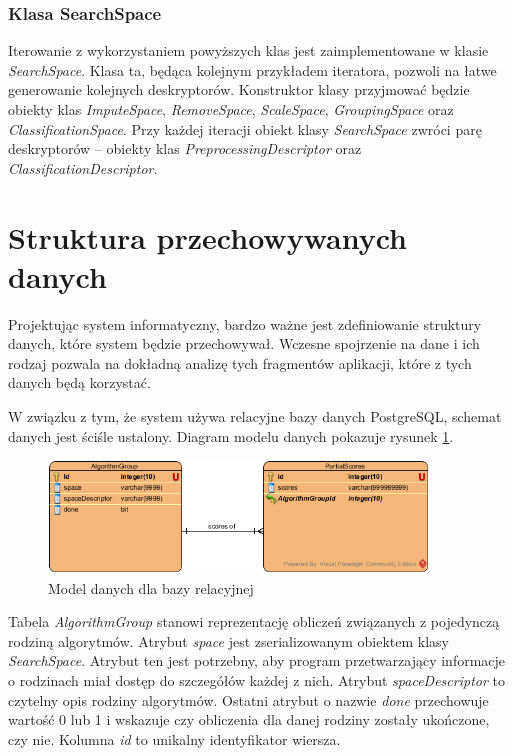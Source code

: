 \documentclass[../thesis.tex]{subfiles}
\begin{document}
\subsubsection{Klasa SearchSpace}

Iterowanie z wykorzystaniem powyższych klas jest zaimplementowane w klasie \emph{SearchSpace}. Klasa ta, będąca kolejnym przykładem iteratora, pozwoli na łatwe generowanie kolejnych deskryptorów. Konstruktor klasy przyjmować będzie obiekty klas \emph{ImputeSpace}, \emph{RemoveSpace}, \emph{ScaleSpace}, \emph{GroupingSpace} oraz \emph{ClassificationSpace}. Przy każdej iteracji obiekt klasy \emph{SearchSpace} zwróci parę deskryptorów -- obiekty klas \emph{PreprocessingDescriptor} oraz \emph{ClassificationDescriptor}.

\section{Struktura przechowywanych danych}

Projektując system informatyczny, bardzo ważne jest zdefiniowanie struktury danych, które system będzie przechowywał. Wczesne spojrzenie na dane i ich rodzaj pozwala na dokładną analizę tych fragmentów aplikacji, które z tych danych będą korzystać. 

W związku z tym, że system używa relacyjne bazy danych PostgreSQL, schemat danych jest ściśle ustalony. Diagram modelu danych pokazuje rysunek \ref{proj:diagram_data}.

\begin{figure}[h]
\centering
\includegraphics[width=0.9\textwidth]{data_diagram.png}
\caption{Model danych dla bazy relacyjnej}
\label{proj:diagram_data}
\end{figure}

Tabela \emph{AlgorithmGroup} stanowi reprezentację obliczeń związanych z pojedynczą rodziną algorytmów. Atrybut \emph{space} jest zserializowanym obiektem klasy \emph{SearchSpace}. Atrybut ten jest potrzebny, aby program przetwarzający informacje o rodzinach miał dostęp do szczegółów każdej z nich. Atrybut \emph{spaceDescriptor} to czytelny opis rodziny algorytmów. Ostatni atrybut o nazwie \emph{done} przechowuje wartość 0 lub 1 i wskazuje czy obliczenia dla danej rodziny zostały ukończone, czy nie. Kolumna \emph{id} to unikalny identyfikator wiersza.
\end{document}
